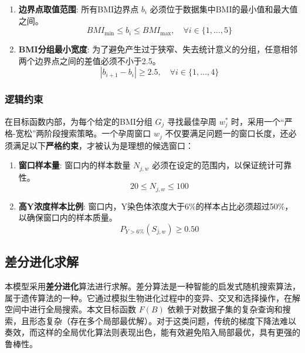 \begin{enumerate}
    \item \textbf{边界点取值范围}: 所有BMI边界点 $b_i$ 必须位于数据集中BMI的最小值和最大值之间。
          \begin{equation}
              BMI_{\min} \le b_i \le BMI_{\max}, \quad \forall i \in \{1, \dots, 5\}
          \end{equation}

    \item \textbf{BMI分组最小宽度}: 为了避免产生过于狭窄、失去统计意义的分组，任意相邻两个边界点之间的差值必须不小于2.5。
          \begin{equation}
              |b_{i+1} - b_i| \ge 2.5, \quad \forall i \in \{1, \dots, 4\}
          \end{equation}
\end{enumerate}

\subsubsection{逻辑约束}

在目标函数内部，为每个给定的BMI分组 $G_j$ 寻找最佳孕周 $w_j^*$ 时，采用一个“严格-宽松”两阶段搜索策略。一个孕周窗口 $w_j$ 不仅要满足问题一的窗口长度，还必须满足以下\textbf{严格约束}，才被认为是理想的候选窗口：
\begin{enumerate}
    \item \textbf{窗口样本量}: 窗口内的样本数量 $N_{j,w}$ 必须在设定的范围内，以保证统计可靠性。
          \begin{equation}
              20 \le N_{j,w} \le 100
          \end{equation}
    \item \textbf{高Y浓度样本比例}: 窗口内，Y染色体浓度大于6\%的样本占比必须超过50\%，以确保窗口内的样本质量。
          \begin{equation}
              P_{Y>6\%}(S_{j,w}) \ge 0.50
          \end{equation}
\end{enumerate}

\subsection{差分进化求解}

本模型采用\textbf{差分进化}算法进行求解。差分算法是一种智能的启发式随机搜索算法，属于遗传算法的一种。它通过模拟生物进化过程中的变异、交叉和选择操作，在解空间中进行全局搜索。本文目标函数 $F(B)$ 依赖于对数据子集的复杂查询和搜索，且形态复杂（存在多个局部最优解）。对于这类问题，传统的梯度下降法难以奏效，而这样的全局优化算法则表现出色，能有效避免陷入局部最优，具有更强的鲁棒性。

